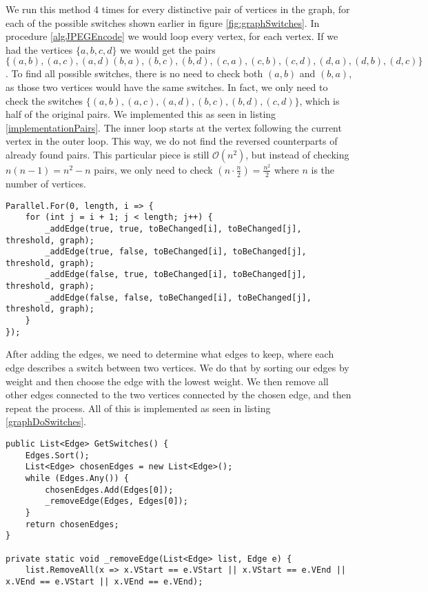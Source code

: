 We run this method 4 times for every distinctive pair of vertices in the graph, for each of the possible switches shown earlier in figure \ref{fig:graphSwitches}.
In procedure \ref{algJPEGEncode} we would loop every vertex, for each vertex.
If we had the vertices $\{a,b,c,d\}$ we would get the pairs $\{(a,b),(a,c),(a,d)(b,a),(b,c),(b,d),(c,a),(c,b),(c,d),(d,a),(d,b),(d,c)\}$.
To find all possible switches, there is no need to check both $(a,b)$ and $(b,a)$, as those two vertices would have the same switches.
In fact, we only need to check the switches $\{(a,b),(a,c),(a,d),(b,c),(b,d),(c,d)\}$, which is half of the original pairs.
We implemented this as seen in listing \ref{implementationPairs}.
The inner loop starts at the vertex following the current vertex in the outer loop.
This way, we do not find the reversed counterparts of already found pairs.
This particular piece is still $\mathcal{O}(n^2)$, but instead of checking $n(n-1)=n^2-n$ pairs, we only need to check $(n\cdot\frac{n}{2})=\frac{n^2}{2}$ where $n$ is the number of vertices. 


\begin{lstlisting}[firstnumber=655,label=implementationPairs]
Parallel.For(0, length, i => {
    for (int j = i + 1; j < length; j++) {
        _addEdge(true, true, toBeChanged[i], toBeChanged[j], threshold, graph);
        _addEdge(true, false, toBeChanged[i], toBeChanged[j], threshold, graph);
        _addEdge(false, true, toBeChanged[i], toBeChanged[j], threshold, graph);
        _addEdge(false, false, toBeChanged[i], toBeChanged[j], threshold, graph);
    }
});
\end{lstlisting}

After adding the edges, we need to determine what edges to keep, where each edge describes a switch between two vertices.
We do that by sorting our edges by weight and then choose the edge with the lowest weight. We then remove all other edges connected to the two vertices connected by the chosen edge, and then repeat the process.
All of this is implemented as seen in listing \ref{graphDoSwitches}.

\begin{lstlisting}[firstnumber=14,label=graphDoSwitches]
public List<Edge> GetSwitches() {
    Edges.Sort();
    List<Edge> chosenEdges = new List<Edge>();
    while (Edges.Any()) {
        chosenEdges.Add(Edges[0]);
        _removeEdge(Edges, Edges[0]);
    }
    return chosenEdges;
}

private static void _removeEdge(List<Edge> list, Edge e) {
    list.RemoveAll(x => x.VStart == e.VStart || x.VStart == e.VEnd || x.VEnd == e.VStart || x.VEnd == e.VEnd);

\end{lstlisting}

